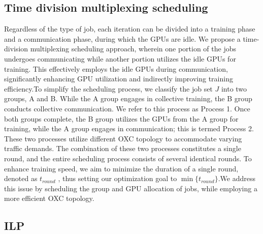 \documentclass[conference]{IEEEtran}
\begin{document}
\subsection{Time division multiplexing scheduling}


Regardless of the type of job, each iteration can be divided into a training phase and a communication phase, during which the GPUs are idle. We propose a time-division multiplexing scheduling approach, wherein one portion of the jobs undergoes communicating while another portion utilizes the idle GPUs for training. This effectively employs the idle GPUs during communication, significantly enhancing GPU utilization and indirectly improving training efficiency.To simplify the scheduling process, we classify the job set $J$ into two groups, A and B. While the A group engages in collective training, the B group conducts collective communication. We refer to this process as Process 1. Once both groups complete, the B group utilizes the GPUs from the A group for training, while the A group engages in communication; this is termed Process 2. These two processes utilize different OXC topology to accommodate varying traffic demands. The combination of these two processes constitutes a single round, and the entire scheduling process consists of several identical rounds. To enhance training speed, we aim to minimize the duration of a single round, denoted as $t_{round}$ , thus setting our optimization goal to $\min\{t_{round}\}$.We address this issue by scheduling the group and GPU allocation of jobs, while employing a more efficient OXC topology.

\subsection{ILP}
\end{document}
